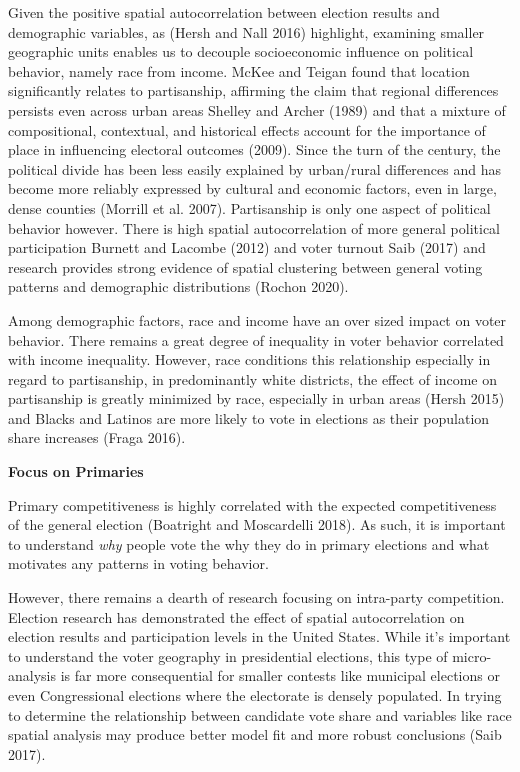\documentclass[
]{article}
\begin{document}
Given the positive spatial autocorrelation between election results and
demographic variables, as (Hersh and Nall 2016) highlight, examining
smaller geographic units enables us to decouple socioeconomic influence
on political behavior, namely race from income. McKee and Teigan found
that location significantly relates to partisanship, affirming the claim
that regional differences persists even across urban areas Shelley and
Archer (1989) and that a mixture of compositional, contextual, and
historical effects account for the importance of place in influencing
electoral outcomes (2009). Since the turn of the century, the political
divide has been less easily explained by urban/rural differences and has
become more reliably expressed by cultural and economic factors, even in
large, dense counties (Morrill et al. 2007). Partisanship is only one
aspect of political behavior however. There is high spatial
autocorrelation of more general political participation Burnett and
Lacombe (2012) and voter turnout Saib (2017) and research provides
strong evidence of spatial clustering between general voting patterns
and demographic distributions (Rochon 2020).

Among demographic factors, race and income have an over sized impact on
voter behavior. There remains a great degree of inequality in voter
behavior correlated with income inequality. However, race conditions
this relationship especially in regard to partisanship, in predominantly
white districts, the effect of income on partisanship is greatly
minimized by race, especially in urban areas (Hersh 2015) and Blacks and
Latinos are more likely to vote in elections as their population share
increases (Fraga 2016).

\textbf{Focus on Primaries}

Primary competitiveness is highly correlated with the expected
competitiveness of the general election (Boatright and Moscardelli
2018). As such, it is important to understand \emph{why} people vote the
why they do in primary elections and what motivates any patterns in
voting behavior.

However, there remains a dearth of research focusing on intra-party
competition. Election research has demonstrated the effect of spatial
autocorrelation on election results and participation levels in the
United States. While it's important to understand the voter geography in
presidential elections, this type of micro-analysis is far more
consequential for smaller contests like municipal elections or even
Congressional elections where the electorate is densely populated. In
trying to determine the relationship between candidate vote share and
variables like race spatial analysis may produce better model fit and
more robust conclusions (Saib 2017).
\end{document}
